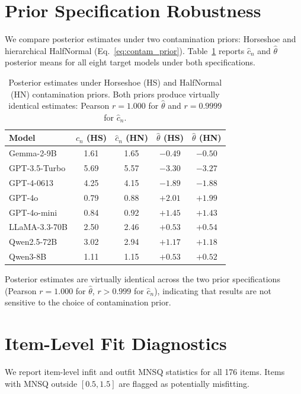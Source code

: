 \section{Prior Specification Robustness}
\label{app:prior_robustness}

We compare posterior estimates under two contamination priors: Horseshoe \citep{piironen2017horseshoe} and hierarchical HalfNormal (Eq.~\ref{eq:contam_prior}). Table~\ref{tab:prior_robustness} reports $\hat{c}_n$ and $\hat{\theta}$ posterior means for all eight target models under both specifications.

\begin{table}[h]
\centering
\small
\begin{tabular}{lcccc}
\toprule
\textbf{Model} & $\hat{c}_n$ (HS) & $\hat{c}_n$ (HN) & $\hat{\theta}$ (HS) & $\hat{\theta}$ (HN) \\
\midrule
Gemma-2-9B & 1.61 & 1.65 & $-0.49$ & $-0.50$ \\
GPT-3.5-Turbo & 5.69 & 5.57 & $-3.30$ & $-3.27$ \\
GPT-4-0613 & 4.25 & 4.15 & $-1.89$ & $-1.88$ \\
GPT-4o & 0.79 & 0.88 & $+2.01$ & $+1.99$ \\
GPT-4o-mini & 0.84 & 0.92 & $+1.45$ & $+1.43$ \\
LLaMA-3.3-70B & 2.50 & 2.46 & $+0.53$ & $+0.54$ \\
Qwen2.5-72B & 3.02 & 2.94 & $+1.17$ & $+1.18$ \\
Qwen3-8B & 1.11 & 1.15 & $+0.53$ & $+0.52$ \\
\bottomrule
\end{tabular}
\caption{Posterior estimates under Horseshoe (HS) and HalfNormal (HN) contamination priors. Both priors produce virtually identical estimates: Pearson $r = 1.000$ for $\hat{\theta}$ and $r = 0.9999$ for $\hat{c}_n$.}
\label{tab:prior_robustness}
\end{table}

Posterior estimates are virtually identical across the two prior specifications (Pearson $r = 1.000$ for $\hat{\theta}$, $r > 0.999$ for $\hat{c}_n$), indicating that results are not sensitive to the choice of contamination prior.


\section{Item-Level Fit Diagnostics}
\label{app:item_diagnostics}

We report item-level infit and outfit MNSQ statistics for all 176 items. Items with MNSQ outside $[0.5, 1.5]$ are flagged as potentially misfitting.

